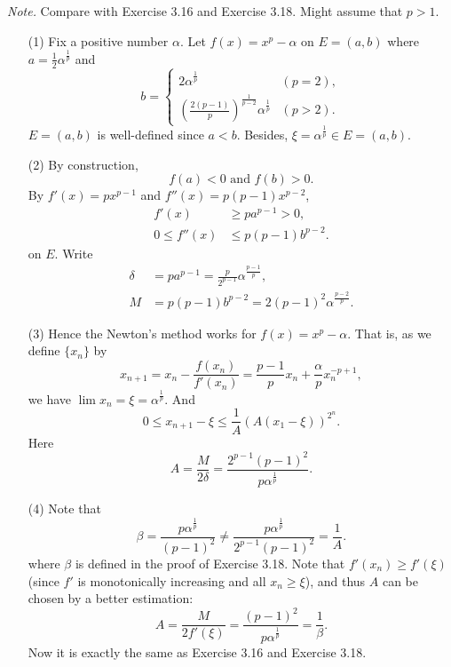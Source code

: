 \documentclass{article}
\begin{document}
\emph{Note.}
Compare with Exercise 3.16 and Exercise 3.18.
Might assume that $p > 1$.
\begin{enumerate}
\item[(1)]
Fix a positive number $\alpha$.
Let $f(x) = x^p - \alpha$ on $E = (a,b)$
where $a = \frac{1}{2} \alpha^{\frac{1}{p}}$ and
\begin{equation*}
  b =
    \begin{cases}
      2 \alpha^{\frac{1}{p}}
      & (p = 2), \\
      \left( \frac{2(p-1)}{p} \right)^{\frac{1}{p-2}} \alpha^{\frac{1}{p}}
      & (p > 2).
    \end{cases}
\end{equation*}
$E = (a,b)$ is well-defined since $a < b$.
Besides, $\xi = \alpha^{\frac{1}{p}} \in E = (a,b)$.

\item[(2)]
By construction,
\[
  f(a) < 0 \text{ and } f(b) > 0.
\]
By $f'(x) = px^{p-1}$ and $f''(x) = p(p-1)x^{p-2}$,
\begin{align*}
  f'(x) &\geq pa^{p-1} > 0, \\
  0 \leq f''(x) &\leq p(p-1)b^{p-2}.
\end{align*}
on $E$.
Write
\begin{align*}
  \delta &= pa^{p-1} = \frac{p}{2^{p-1}} \alpha^{\frac{p-1}{p}}, \\
  M &= p(p-1)b^{p-2} = 2 (p-1)^2 \alpha^{\frac{p-2}{p}}.
\end{align*}

\item[(3)]
Hence the Newton's method works for $f(x) = x^p - \alpha$.
That is, as we define $\{x_n\}$ by
\[
  x_{n+1}
  = x_n - \frac{f(x_n)}{f'(x_n)}
  = \frac{p-1}{p}x_n + \frac{\alpha}{p} x_n^{-p+1},
\]
we have $\lim x_n = \xi = \alpha^{\frac{1}{p}}$.
And
\[
  0 \leq x_{n+1} - \xi \leq \frac{1}{A}(A(x_1-\xi))^{2^n}.
\]
Here
\[
  A = \frac{M}{2 \delta} = \frac{2^{p-1}(p-1)^2}{p \alpha^{\frac{1}{p}}}.
\]

\item[(4)]
Note that
\[
  \beta
  = \frac{p \alpha^{\frac{1}{p}}}{(p-1)^2}
  \neq \frac{p \alpha^{\frac{1}{p}}}{2^{p-1}(p-1)^2} = \frac{1}{A}.
\]
where $\beta$ is defined in the proof of Exercise 3.18.
Note that $f'(x_n) \geq f'(\xi)$
(since $f'$ is monotonically increasing and all $x_n \geq \xi$),
and thus $A$ can be chosen by a better estimation:
\[
  A = \frac{M}{2 f'(\xi)} = \frac{(p-1)^2}{p \alpha^{\frac{1}{p}}} = \frac{1}{\beta}.
\]
Now it is exactly the same as Exercise 3.16 and Exercise 3.18. \\
\end{enumerate}
\end{document}
